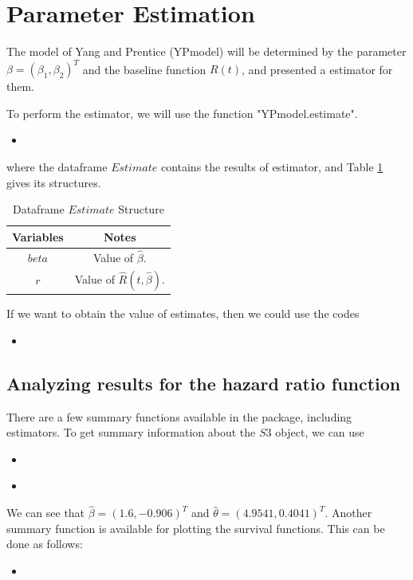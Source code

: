 \documentclass[12pt]{article}
\newcommand{\insertcode}[2]{\begin{itemize}\item[]\end{itemize}} %
\begin{document}
\section{Parameter Estimation}\label{Section:estimation}
 The model of Yang and Prentice (YPmodel) will be determined by the parameter $\beta = (\beta_1, \beta_2)^T$ and the baseline function $R(t)$, and \cite{yang2005semiparametric} presented a estimator for them.

To perform the estimator, we will use the function "YPmodel.estimate".
\insertcode{"Scripts/code7 - 2.pl"}{Performing estimator.}
where the dataframe $Estimate$ contains the results of estimator, and Table \ref{Tab:EstimateStructure} gives its structures.

\begin{table}[!h]
\renewcommand{\arraystretch}{1.3}
\caption{Dataframe $Estimate$ Structure} \label{Tab:EstimateStructure} \centering
\begin{tabular}{|c||c|}
  \hline
  Variables & Notes  \\
  \hline
  $beta$ & Value of $\hat{\beta}$. \\
  $r$ & Value of $\hat{R}(t,\hat{\beta})$. \\
  \hline
\end{tabular}
\end{table}

If we want to obtain the value of estimates, then we could use the codes
\insertcode{"Scripts/result13.pl"}{Getting value of $\hat{\beta}$.}

\subsection{Analyzing results for the hazard ratio function}
There are a few summary functions available in the package, including estimators.
To get summary information about the $S3$ object, we can use

\insertcode{"Scripts/code10.pl"}{Summarizing estimates' results.}
\insertcode{"Scripts/result10.pl"}{Summarizing estimates' results.}

We can see that $\hat{\beta}=(1.6,-0.906)^T$ and $\hat{\theta}=(4.9541,0.4041)^T$.
Another summary function is available for plotting the survival functions. This can be done as follows:
\insertcode{"Scripts/code12.pl"}{Plotting estimates' results.}
\end{document}
